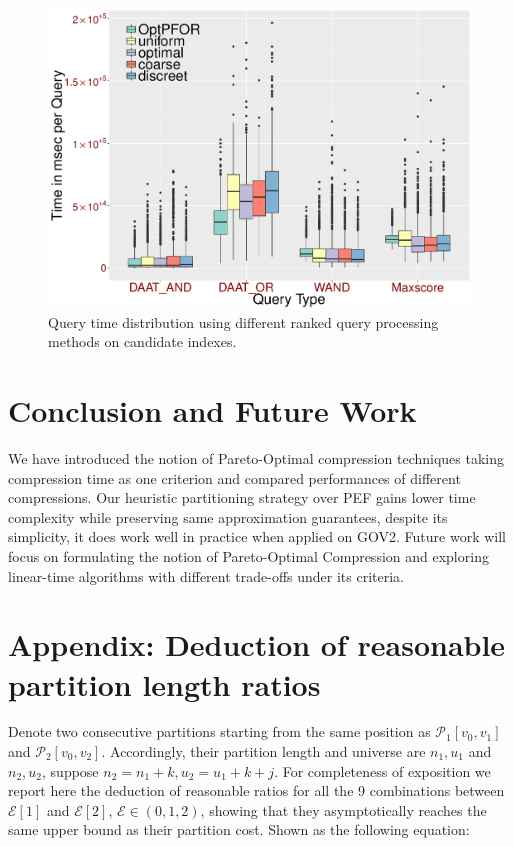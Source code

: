 \documentclass[runningheads,a4paper]{llncs}
\begin{document}
\begin{figure}
	\centering
	\includegraphics[width=0.7\linewidth]{queries}
	\caption{Query time distribution using different ranked query processing methods on candidate indexes.}
	\label{fig:queries}
\end{figure}

\section{Conclusion and Future Work}\label{sec:conclusion}

We have introduced the notion of Pareto-Optimal compression techniques taking compression time as one criterion and compared performances of different compressions. Our heuristic partitioning strategy over PEF gains lower time complexity while preserving same approximation guarantees,
despite its simplicity, it does work well in practice when applied on GOV2.
Future work will focus on formulating the notion of Pareto-Optimal Compression and exploring linear-time algorithms with different trade-offs under its criteria.




\section*{Appendix: Deduction of reasonable partition length ratios}\label{sec:appendix}

Denote two consecutive partitions starting from the same position as $ \mathcal{P}_{1}[ v_0, v_1 ] $ and $ \mathcal{P}_{2}[v_0, v_2] $. Accordingly, their partition length and universe are $ n_1, u_1 $ and $ n_2, u_2 $, suppose $n_2 = n_1 + k, u_2 = u_1 + k + j $.
For completeness of exposition we report here the deduction of reasonable ratios for all the 9 combinations between $ \mathcal{E}[1] $ and $ \mathcal{E}[2] $, $ \mathcal{E} \in (0,1,2) $, showing that they asymptotically reaches the same upper bound as their partition cost. Shown as the following equation:
\end{document}
